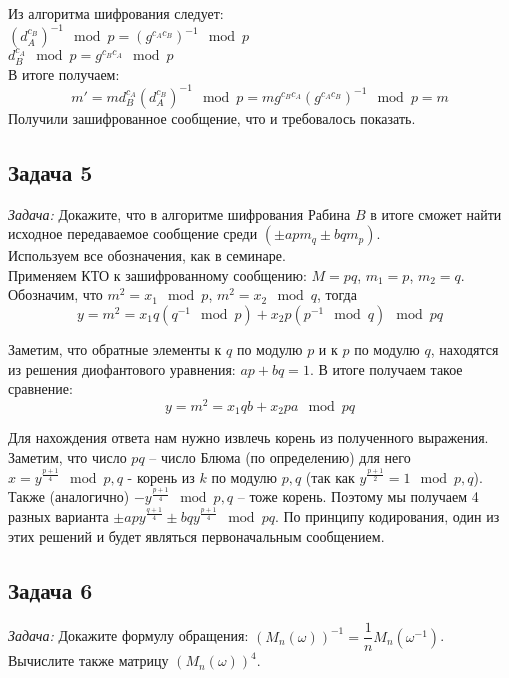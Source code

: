 \documentclass[a4paper,12pt]{article} %
\begin{document}
Из алгоритма шифрования следует:\\
$ \left( d_A^{c_B} \right) ^{-1} \mod p = \left( g^{c_Ac_B} \right) ^{-1} \mod p$\\
$ d_B^{c_A} \mod p = g^{c_B c_A} \mod p $\\

В итоге получаем: $$ m' = m d_B^{c_A} \left( d_A^{c_B} \right)^{-1}\mod p = m g^{c_B c_A} \left( g^{c_Ac_B} \right) ^{-1} \mod p = m$$
Получили зашифрованное сообщение, что и требовалось показать.



\subsection*{Задача 5}
\textit{Задача:} Докажите, что в алгоритме шифрования Рабина $B$ в итоге сможет найти исходное передаваемое сообщение среди $(\pm apm_q \pm bqm_p)$. \smallskip \\

Используем все обозначения, как в семинаре.\\
Применяем КТО к зашифрованному сообщению: $ M = pq $, $ m_1 = p $, $ m_2 = q $.
Обозначим, что $ m^2 = x_1 \mod p$, $ m^2 = x_2 \mod q $, тогда\\
$$
y = m^2 = x_1 q \left( q^{-1} \mod p \right) + x_2 p \left(p^{-1} \mod q \right) \mod pq
$$

Заметим, что обратные элементы к $ q $ по модулю $ p $ и к $ p $ по модулю $ q $, находятся из решения диофантового уравнения: $ ap + bq = 1$. В итоге получаем такое сравнение:
$$
y = m^2 = x_1 q b + x_2 p a \mod pq
$$

Для нахождения ответа нам нужно извлечь корень из полученного выражения. Заметим, что число $ pq $ -- число Блюма (по определению) для него $ x = y ^{\frac{p+1}{4}} \mod p,q $ - корень из $ k $ по модулю $ p,q $ (так как $ y^{\frac{p+1}{2}} = 1 \mod p,q $). Также (аналогично) $ -y ^{\frac{p+1}{4}} \mod p,q  $ -- тоже корень. Поэтому мы получаем 4 разных варианта $ \pm a p y^{\frac{q+1}{4}} \pm b q y^{\frac{p+1}{4}} \mod pq$. По принципу кодирования, один из этих решений и будет являться первоначальным сообщением.



\subsection*{Задача 6}
\textit{Задача:} Докажите формулу обращения: $(M_n(\omega))^{-1} = \dfrac{1}{n}M_n(\omega^{-1})$. Вычислите также матрицу $(M_n(\omega))^4$. \smallskip \\
\end{document}
